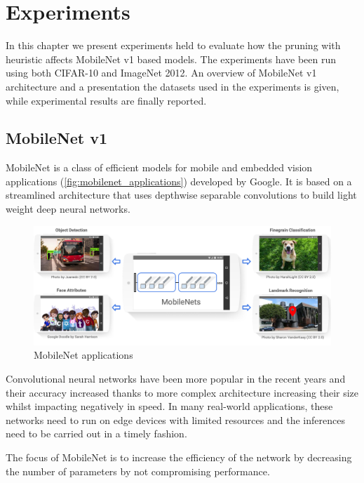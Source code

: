 \chapter{Experiments}\label{ch:experiments}
In this chapter we present experiments held to evaluate how the pruning with
heuristic affects MobileNet v1\cite{howard2017mobilenets} based models. The
experiments have been run using both CIFAR-10\cite{cifar_10} and ImageNet
2012\cite{imagenet_cvpr09}.
An overview of MobileNet v1 architecture and a presentation the datasets used
in the experiments is given, while experimental results are finally reported.

\section{MobileNet v1}
MobileNet is a class of efficient models for mobile and embedded vision
applications (\autoref{fig:mobilenet_applications}) developed by Google.
It is based on a streamlined architecture that uses depthwise separable
convolutions to build light weight deep neural networks.

\begin{figure}[ht]
    \includegraphics[width=\textwidth]{images/experiments/mobilenet_applications.png}
    \centering
    \caption{MobileNet applications}\label{fig:mobilenet_applications}
\end{figure}

Convolutional neural networks have been more popular in the recent years and
their accuracy increased thanks to more complex architecture increasing their
size whilst impacting negatively in speed. In many real-world applications,
these networks need to run on edge devices with limited resources and the
inferences need to be carried out in a timely fashion.

The focus of MobileNet is to increase the efficiency of the network by
decreasing the number of parameters by not compromising
performance\cite{review_mobilenet}.

